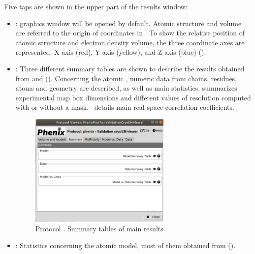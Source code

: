 \begin{itemize}
Five taps are shown in the upper part of the results window:
   \begin{itemize}
     \item {}: \chimera graphics window will be opened by default. Atomic structure and volume are referred to the origin of coordinates in \chimera. To show the relative position of atomic structure and electron density volume, the three coordinate axes are represented; X axis (red), Y axis (yellow), and Z axis (blue) ().
     \item {}: Three different summary tables are shown to describe the results obtained from  and  (). Concerning the atomic , numeric data from chains, residues, atoms and geometry are described, as well as main \molprobity statistics.  summarizes experimental map box dimensions and different values of resolution computed with or without a mask. \ details main real-space correlation coefficients.
        \begin{figure}[H]
         \centering 
         \captionsetup{width=.7\linewidth} 
         \includegraphics[width=0.65\textwidth]{Images_appendix/Fig201.pdf}
         \caption{Protocol . Summary tables of main\phenix {} results.}
         \label{fig:validationCryoEM_protocol_3}
        \end{figure}
     \item {}: Statistics concerning the atomic model, most of them obtained from \molprobity ().
        \begin{figure}[H]
         \centering 
         \captionsetup{width=.7\linewidth} 

\end{figure}
\end{itemize}
\end{itemize}
